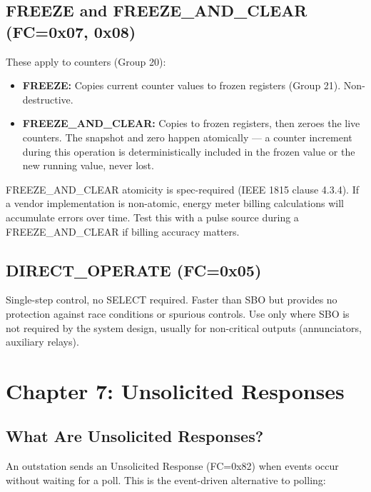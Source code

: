 \documentclass[11pt,twoside]{article}
\begin{document}
\subsection{FREEZE and FREEZE\_AND\_CLEAR (FC=0x07, 0x08)}

These apply to counters (Group 20):
\begin{itemize}[noitemsep]
  \item \textbf{FREEZE:} Copies current counter values to frozen registers (Group 21). Non-destructive.
  \item \textbf{FREEZE\_AND\_CLEAR:} Copies to frozen registers, then zeroes the live counters. The snapshot and zero happen atomically --- a counter increment during this operation is deterministically included in the frozen value or the new running value, never lost.
\end{itemize}

\begin{specbox}
FREEZE\_AND\_CLEAR atomicity is spec-required (IEEE 1815 clause 4.3.4). If a vendor implementation is non-atomic, energy meter billing calculations will accumulate errors over time. Test this with a pulse source during a FREEZE\_AND\_CLEAR if billing accuracy matters.
\end{specbox}

\subsection{DIRECT\_OPERATE (FC=0x05)}

Single-step control, no SELECT required. Faster than SBO but provides no protection against race conditions or spurious controls. Use only where SBO is not required by the system design, usually for non-critical outputs (annunciators, auxiliary relays).

\section{Chapter 7: Unsolicited Responses}

\subsection{What Are Unsolicited Responses?}

An outstation sends an Unsolicited Response (FC=0x82) when events occur without waiting for a poll. This is the event-driven alternative to polling:
\end{document}
